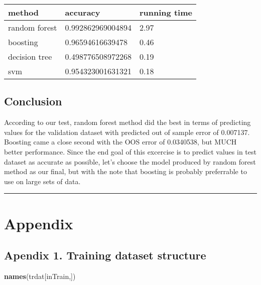 \documentclass[]{article}
\newenvironment{Shaded}{\begin{snugshade}}{\end{snugshade}}
\newcommand{\KeywordTok}[1]{\textcolor[rgb]{0.13,0.29,0.53}{\textbf{#1}}}
\newcommand{\NormalTok}[1]{#1}
\begin{document}
\begin{table}[H]
\centering
\begin{tabular}{l|l|l}
\hline
method & accuracy & running time\\
\hline
random forest & 0.992862969004894 & 2.97\\
\hline
boosting & 0.96594616639478 & 0.46\\
\hline
decision tree & 0.498776508972268 & 0.19\\
\hline
svm & 0.954323001631321 & 0.18\\
\hline
\end{tabular}
\end{table}

\subsection{Conclusion}\label{conclusion}

According to our test, random forest method did the best in terms of
predicting values for the validation dataset with predicted out of
sample error of 0.007137. Boosting came a close second with the OOS
error of 0.0340538, but MUCH better performance. Since the end goal of
this excercise is to predict values in test dataset as accurate as
possible, let's choose the model produced by random forest method as our
final, but with the note that boosting is probably preferrable to use on
large sets of data.

\begin{center}\rule{0.5\linewidth}{\linethickness}\end{center}

\section{Appendix}\label{appendix}

\subsection{Apendix 1. Training dataset
structure}\label{apendix-1.-training-dataset-structure}

\begin{Shaded}
\begin{Highlighting}[]
\KeywordTok{names}\NormalTok{(trdat[inTrain,])}
\end{Highlighting}
\end{Shaded}
\end{document}
